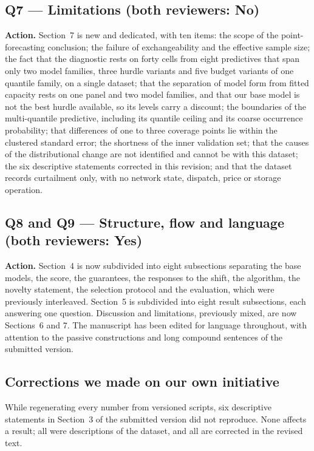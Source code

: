 \documentclass[11pt,a4paper]{article}
\newcommand{\action}[1]{\textbf{Action.} #1}
\begin{document}
\subsection*{Q7 --- Limitations (both reviewers: No)}

\action{Section~7 is new and dedicated, with ten items: the scope of the point-forecasting conclusion; the failure of exchangeability and the effective sample size; the fact that the diagnostic rests on forty cells from eight predictives that span only two model families, three hurdle variants and five budget variants of one quantile family, on a single dataset; that the separation of model form from fitted capacity rests on one panel and two model families, and that our base model is not the best hurdle available, so its levels carry a discount; the boundaries of the multi-quantile predictive, including its quantile ceiling and its coarse occurrence probability; that differences of one to three coverage points lie within the clustered standard error; the shortness of the inner validation set; that the causes of the distributional change are not identified and cannot be with this dataset; the six descriptive statements corrected in this revision; and that the dataset records curtailment only, with no network state, dispatch, price or storage operation.}

\subsection*{Q8 and Q9 --- Structure, flow and language (both reviewers: Yes)}

\action{Section~4 is now subdivided into eight subsections separating the base models, the score, the guarantees, the responses to the shift, the algorithm, the novelty statement, the selection protocol and the evaluation, which were previously interleaved. Section~5 is subdivided into eight result subsections, each answering one question. Discussion and limitations, previously mixed, are now Sections~6 and 7. The manuscript has been edited for language throughout, with attention to the passive constructions and long compound sentences of the submitted version.}

\subsection{Corrections we made on our own initiative}
\label{sec:correcciones}

While regenerating every number from versioned scripts, six descriptive statements in Section~3 of the submitted version did not reproduce. None affects a result; all were descriptions of the dataset, and all are corrected in the revised text.
\end{document}
